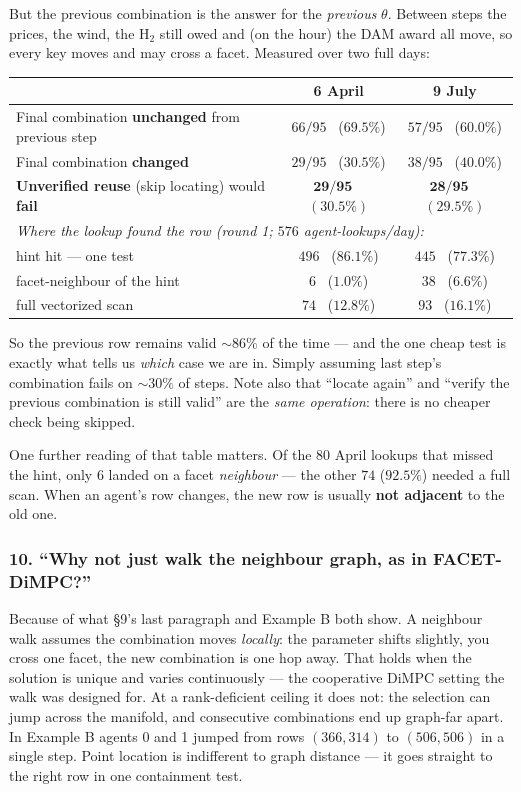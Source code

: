 \documentclass[11pt, letterpaper]{article}
\begin{document}
But the previous combination is the answer for the \emph{previous} $\theta$. Between steps the prices,
the wind, the H$_2$ still owed and (on the hour) the DAM award all move, so every key moves and may
cross a facet. Measured over two full days:

\begin{center}\small
\begin{tabular}{lcc}
\toprule
 & 6 April & 9 July\\
\midrule
Final combination \textbf{unchanged} from previous step & $66/95$ \ ($69.5\%$) & $57/95$ \ ($60.0\%$)\\
Final combination \textbf{changed}                      & $29/95$ \ ($30.5\%$) & $38/95$ \ ($40.0\%$)\\
\textbf{Unverified reuse} (skip locating) would \textbf{fail}& $\mathbf{29/95}$ \ $(\mathbf{30.5\%})$ & $\mathbf{28/95}$ \ $(\mathbf{29.5\%})$\\
\midrule
\multicolumn{3}{l}{\emph{Where the lookup found the row (round 1; $576$ agent-lookups/day):}}\\
\quad hint hit --- one test        & $496$ \ ($86.1\%$) & $445$ \ ($77.3\%$)\\
\quad facet-neighbour of the hint  & $6$ \ ($1.0\%$)    & $38$ \ ($6.6\%$)\\
\quad full vectorized scan         & $74$ \ ($12.8\%$)  & $93$ \ ($16.1\%$)\\
\bottomrule
\end{tabular}
\end{center}

So the previous row remains valid $\sim\!86\%$ of the time --- and the one cheap test is exactly what tells us
\emph{which} case we are in. Simply assuming last step's combination fails on $\sim\!30\%$ of steps.
Note also that ``locate again'' and ``verify the previous combination is still valid'' are the
\emph{same operation}: there is no cheaper check being skipped.

One further reading of that table matters. Of the $80$ April lookups that missed the hint, only $6$
landed on a facet \emph{neighbour} --- the other $74$ ($92.5\%$) needed a full scan. When an agent's
row changes, the new row is usually \textbf{not adjacent} to the old one.

\subsubsection*{10. ``Why not just walk the neighbour graph, as in FACET-DiMPC?''}
Because of what \S9's last paragraph and Example B both show. A neighbour walk assumes the
combination moves \emph{locally}: the parameter shifts slightly, you cross one facet, the new
combination is one hop away. That holds when the solution is unique and varies continuously --- the
cooperative DiMPC setting the walk was designed for. At a rank-deficient ceiling it does not: the
selection can jump across the manifold, and consecutive combinations end up graph-far apart. In
Example B agents 0 and 1 jumped from rows $(366,314)$ to $(506,506)$ in a single step. Point location
is indifferent to graph distance --- it goes straight to the right row in one containment test.
\end{document}
